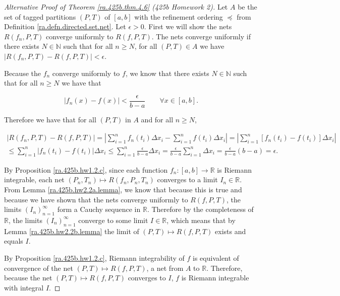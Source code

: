 \begin{proof}[Alternative Proof of Theorem \ref{ra.425b.thm.4.6} (425b Homework 2)]



Let \(A\) be the set of tagged partitions \((P, T)\) of \([a,b]\) with the refinement ordering \(\preceq\) from Definition \ref{ra.defn.directed.set.net}. Let \(\epsilon > 0\). First we will show the nets \(R(f_n, P, T)\) converge uniformly to \(R(f, P, T)\). The nets converge uniformly if there exists \(N \in \mathbb{N}\) such that for all \(n \geq N\), for all \((P, T) \in A\) we have \( |R(f_n, P, T) - R(f, P, T)| < \epsilon\).


%



Because the \(f_n\) converge uniformly to \(f\), we know that there exists \(N \in \mathbb{N}\) such that for all \(n \geq N\) we have that

\begin{equation}\label{ra.425b.hw2.2.d.1}
|f_n(x) - f(x)| < \frac{\epsilon}{b-a} \qquad \forall x \in [a,b].
\end{equation}


 Therefore we have that for all \((P, T)\) in \(A\) and for all \(n \geq N\),
 
\begin{multline*}
|R(f_n, P, T) - R(f, P, T)|   = \left| \sum_{i=1}^n f_n (t_i) \Delta x_i - \sum_{i=1}^n f (t_i) \Delta x_i  \right| = \left| \sum_{i=1}^n \left[ f_n (t_i) - f(t_i) \right] \Delta x_i  \right| 
\\ \leq  \sum_{i=1}^n  \left| f_n (t_i) - f(t_i) \right| \Delta x_i   \leq  \sum_{i=1}^n  \frac{\epsilon}{b-a} \Delta x_i  =   \frac{\epsilon}{b-a}  \sum_{i=1}^n \Delta x_i =  \frac{\epsilon}{b-a}  (b-a) = \epsilon.
\end{multline*}

By Proposition \ref{ra.425b.hw1.2.c}, since each function \(f_n: [a,b] \to \mathbb{R}\) is Riemann integrable, each net \((P_n,T_n) \mapsto R(f_n, P_n , T_n)\) converges to a limit \(I_n \in \mathbb{R}\). From Lemma \ref{ra.425b.hw2.2a.lemma}, we know that because this is true and because we have shown that the nets converge uniformly to \(R(f, P, T)\), the limits \((I_n)_{n=1}^\infty\) form a Cauchy sequence in \(\mathbb{R}\). Therefore by the completeness of \(\mathbb{R}\), the limits \((I_n)_{n=1}^\infty\) converge to some limit \(I \in \mathbb{R}\), which means that by Lemma \ref{ra.425b.hw2.2b.lemma} the limit of \((P, T) \mapsto R(f, P, T)\) exists and equals \(I\).

By Proposition \ref{ra.425b.hw1.2.c}, Riemann integrability of \(f\) is equivalent of convergence of the net \((P,T) \mapsto R(f, P , T)\), a net from \(A\) to \(\mathbb{R}\). Therefore, because the net \((P,T) \mapsto R(f, P, T)\) converges to \(I\), \(f\) is Riemann integrable with integral \(I\).


\end{proof}

